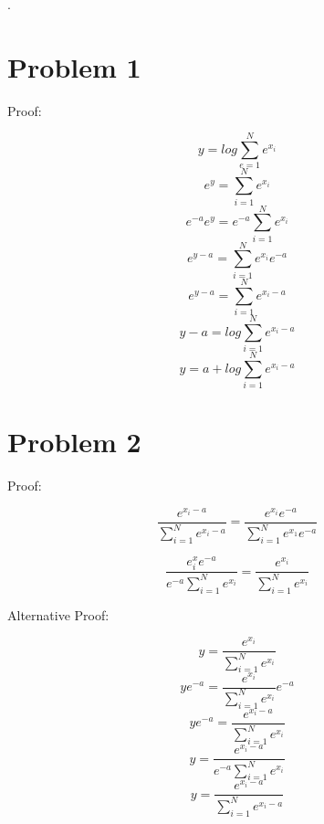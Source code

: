 \documentclass[12pt,letterpaper]{article}
\begin{document}
.

\section*{Problem 1}

Proof:

$$y = log \sum_{e=1}^N e^{x_i}$$
$$e^y = \sum_{i=1}^N e^{x_i}$$
$$e^{-a}e^{y} = e^{-a}\sum_{i=1}^N e^{x_i}$$
$$e^{y-a} = \sum_{i=1}^N e^{x_i}e^{-a}$$
$$e^{y-a} = \sum_{i=1}^N e^{x_i - a}$$
$$y-a = log\sum_{i=1}^N e^{x_i - a}$$
$$y = a + log\sum_{i=1}^N e^{x_i-a}$$

\section*{Problem 2}

Proof: 

$$\frac{e^{x_i - a}}{\sum_{i=1}^N e^{x_i-a}}=\frac{e^{x_i}e^{-a}}{\sum_{i=1}^N e^{x_1}e^{-a}} $$

$$\frac{e^x_ie^{-a}}{e^{-a}\sum_{i=1}^N e^{x_i}} = \frac{e^{x_i}}{\sum_{i=1}^N e^{x_i}}$$


Alternative Proof:

$$y = \frac{e^{x_i}}{\sum_{i=1}^N e^{x_i}}$$
$$y e^{-a} = \frac{e^{x_i}}{\sum_{i=1}^N e^{x_i}} e^{-a}$$
$$y e^{-a} = \frac{e^{x_i - a}}{\sum_{i=1}^N e^{x_i}}$$
$$y = \frac{e^{x_i-a}}{e^{-a}\sum_{i=1}^N e^{x_i}}$$
$$y = \frac{e^{x_i-a}}{\sum_{i=1}^N e^{x_i-a}}$$
\end{document}
